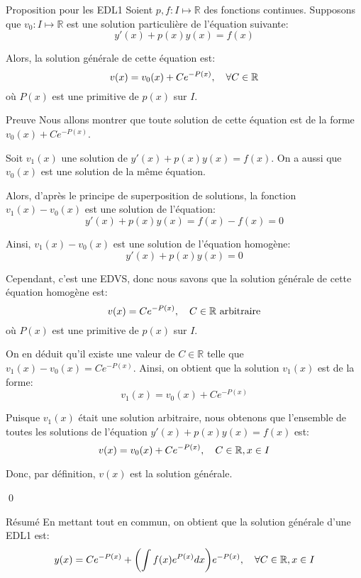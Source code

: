 \documentclass[a4paper]{article}
\begin{document}
\begin{parag}{Proposition pour les EDL1}
    Soient $p, f : I \mapsto \mathbb{R}$ des fonctions continues. Supposons que $v_0 : I \mapsto \mathbb{R}$ est une solution particulière de l'équation suivante:
    \[y'\left(x\right) + p\left(x\right) y\left(x\right) = f\left(x\right)\]

    Alors, la solution générale de cette équation est:
    \[v\left(x\right) = v_0\left(x\right) + Ce^{-P\left(x\right)}, \mathspace \forall C \in \mathbb{R}\]
    où $P\left(x\right)$ est une primitive de $p\left(x\right)$ sur $I$.

    \demonstrationaconnaitre

    \begin{subparag}{Preuve}
        Nous allons montrer que toute solution de cette équation est de la forme $v_0\left(x\right) + Ce^{-P\left(x\right)}$.

        Soit $v_1\left(x\right)$ une solution de $y'\left(x\right) + p\left(x\right)y\left(x\right) = f\left(x\right)$. On a aussi que $v_0\left(x\right)$ est une solution de la même équation.

        Alors, d'après le principe de superposition de solutions, la fonction $v_1\left(x\right) - v_0\left(x\right)$ est une solution de l'équation:
        \[y'\left(x\right) + p\left(x\right)y\left(x\right) = f\left(x\right) - f\left(x\right) = 0\]

        Ainsi, $v_1\left(x\right) - v_0\left(x\right)$ est une solution de l'équation homogène:
        \[y'\left(x\right) + p\left(x\right) y\left(x\right) = 0\]

        Cependant, c'est une EDVS, donc nous savons que la solution générale de cette équation homogène est:
        \[v\left(x\right) = Ce^{-P\left(x\right)}, \mathspace C \in \mathbb{R} \text{ arbitraire}\]
        où $P\left(x\right)$ est une primitive de $p\left(x\right)$ sur $I$.

        On en déduit qu'il existe une valeur de $C \in \mathbb{R}$ telle que $v_1\left(x\right) - v_0\left(x\right) = Ce^{-P\left(x\right)}$. Ainsi, on obtient que la solution $v_1\left(x\right)$ est de la forme:
        \[v_1\left(x\right) = v_0\left(x\right) + Ce^{-P\left(x\right)}\]

        Puisque $v_1\left(x\right)$ était une solution arbitraire, nous obtenons que l'ensemble de toutes les solutions de l'équation $y'\left(x\right) + p\left(x\right)y\left(x\right) = f\left(x\right)$ est:
        \[v\left(x\right) = v_0\left(x\right) + Ce^{-P\left(x\right)}, \mathspace C \in \mathbb{R}, x \in I\]

        Donc, par définition, $v\left(x\right)$ est la solution générale.

        \qed
    \end{subparag}
\end{parag}

\begin{parag}{Résumé}
    En mettant tout en commun, on obtient que la solution générale d'une EDL1 est:
    \[y\left(x\right) = Ce^{-P\left(x\right)} + \left(\int f\left(x\right) e^{P\left(x\right)} dx\right) e^{-P\left(x\right)}, \mathspace \forall C \in \mathbb{R}, x \in I\]
\end{parag}
\end{document}
